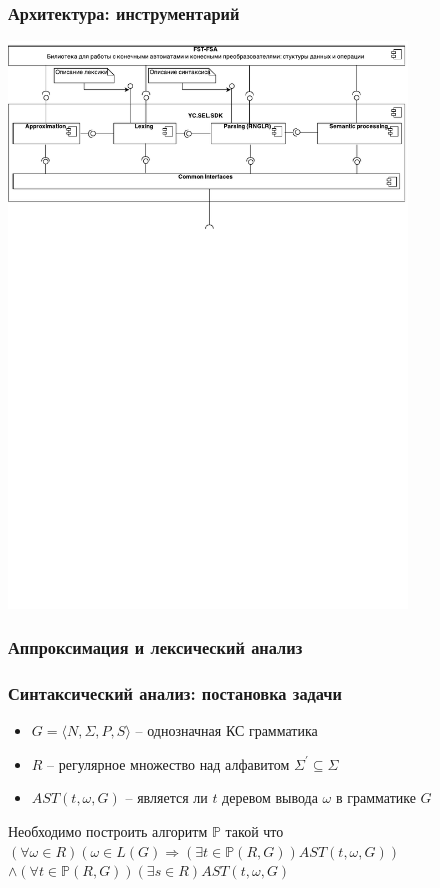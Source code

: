 \documentclass{beamer}
\begin{document}
\begin{frame}
    \transwipe[direction=90]
    \frametitle{Архитектура: инструментарий}
    \begin{center}
        \includegraphics[width=300pt]{pictures/Components.pdf}
    \end{center}
\end{frame}

\begin{frame}
    \transwipe[direction=90]
    \frametitle{Аппроксимация и лексический анализ}    
\end{frame}

\begin{frame}
    \transwipe[direction=90]
    \frametitle{Синтаксический анализ: постановка задачи}
    \begin{itemize}    
        \item $G=\langle N,\Sigma, P,S\rangle$ -- однозначная КС грамматика
        \item $R$ -- регулярное множество над алфавитом ${\Sigma}^{'} \subseteq \Sigma $
        \item $AST(t,\omega,G)$ -- является ли $t$ деревом вывода $\omega$ в грамматике $G$
    \end{itemize}
    Необходимо построить алгоритм $\mathbb{P}$ такой что
    $(\forall \omega \in R) (\omega \in L(G) \Rightarrow (\exists t \in \mathbb{P}(R,G))AST(t, \omega, G))$
    $\land (\forall t \in \mathbb{P}(R,G))(\exists s \in R)AST(t,\omega,G)$
\end{frame}
\end{document}
